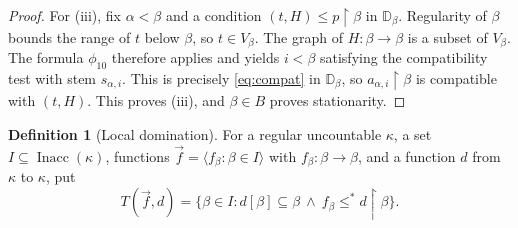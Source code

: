 \documentclass[11pt,a4paper]{amsart}
\theoremstyle{definition}
\newtheorem{definition}[theorem]{Definition}
\theoremstyle{remark}
\newcommand{\D}{\mathbb D}
\DeclareMathOperator{\Inacc}{Inacc}
\begin{document}
\begin{proof}
For (iii), fix \(\alpha<\beta\) and a condition
\((t,H)\leq p\restriction\beta\) in \(\D_\beta\).
Regularity of \(\beta\) bounds the range of \(t\) below
\(\beta\), so \(t\in V_\beta\). The graph of
\(H:\beta\to\beta\) is a subset of \(V_\beta\). The formula \(\phi_{10}\)
therefore applies and yields \(i<\beta\) satisfying the
compatibility test with stem \(s_{\alpha,i}\). This is precisely
\eqref{eq:compat} in \(\D_\beta\), so
\(a_{\alpha,i}\restriction\beta\) is compatible with
\((t,H)\). This proves (iii), and \(\beta\in B\) proves
stationarity.
\end{proof}

\begin{definition}[Local domination]\label{def:domination}
For a regular uncountable \(\kappa\), a set
\(I\subseteq\Inacc(\kappa)\), functions
\(\vec f=\langle f_\beta:\beta\in I\rangle\) with
\(f_\beta:\beta\to\beta\), and a function \(d\) from \(\kappa\) to \(\kappa\), put
\[
 T(\vec f,d)=
 \{\beta\in I:d[\beta]\subseteq\beta
          \ \land\ f_\beta\leq^*d\restriction\beta\}.
\]
\end{definition}
\end{document}
